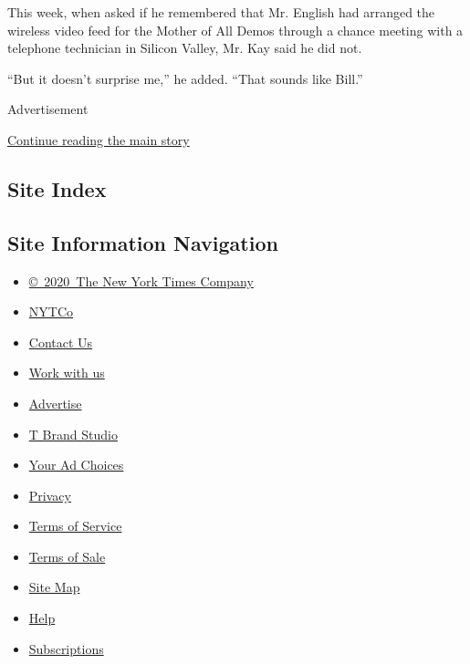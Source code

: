 This week, when asked if he remembered that Mr. English had arranged the
wireless video feed for the Mother of All Demos through a chance meeting
with a telephone technician in Silicon Valley, Mr. Kay said he did not.

``But it doesn't surprise me,'' he added. ``That sounds like Bill.''

Advertisement

\protect\hyperlink{after-bottom}{Continue reading the main story}

\hypertarget{site-index}{%
\subsection{Site Index}\label{site-index}}

\hypertarget{site-information-navigation}{%
\subsection{Site Information
Navigation}\label{site-information-navigation}}

\begin{itemize}
\tightlist
\item
  \href{https://help.nytimes.com/hc/en-us/articles/115014792127-Copyright-notice}{©~2020~The
  New York Times Company}
\end{itemize}

\begin{itemize}
\tightlist
\item
  \href{https://www.nytco.com/}{NYTCo}
\item
  \href{https://help.nytimes.com/hc/en-us/articles/115015385887-Contact-Us}{Contact
  Us}
\item
  \href{https://www.nytco.com/careers/}{Work with us}
\item
  \href{https://nytmediakit.com/}{Advertise}
\item
  \href{http://www.tbrandstudio.com/}{T Brand Studio}
\item
  \href{https://www.nytimes.com/privacy/cookie-policy\#how-do-i-manage-trackers}{Your
  Ad Choices}
\item
  \href{https://www.nytimes.com/privacy}{Privacy}
\item
  \href{https://help.nytimes.com/hc/en-us/articles/115014893428-Terms-of-service}{Terms
  of Service}
\item
  \href{https://help.nytimes.com/hc/en-us/articles/115014893968-Terms-of-sale}{Terms
  of Sale}
\item
  \href{https://spiderbites.nytimes.com}{Site Map}
\item
  \href{https://help.nytimes.com/hc/en-us}{Help}
\item
  \href{https://www.nytimes.com/subscription?campaignId=37WXW}{Subscriptions}
\end{itemize}
